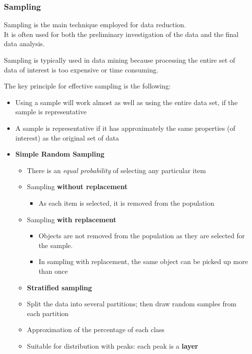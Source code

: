 \subsubsection{Sampling}
Sampling is the main technique employed for data
reduction.\\
It is often used for both the preliminary investigation of the data and the final data analysis.

Sampling is typically used in data mining because
processing the entire set of data of interest is too
expensive or time consuming.

{The key principle for effective sampling is the
following:\ns
\begin{itemize}
	\item Using a sample will work almost as well as using the entire
	      data set, if the sample is representative
	\item A sample is representative if it has approximately the same
	      properties (of interest) as the original set of data
\end{itemize}
}

\begin{itemize}
   \item  \textbf{Simple Random Sampling}
   \begin{itemize}
   	\item There is an \textit{equal probability} of selecting any particular item
	\item Sampling \textbf{without replacement}
   \begin{itemize}
   	\item As each item is selected, it is removed from the population
   \end{itemize}
	\item Sampling \textbf{with replacement}
   \begin{itemize}
   	\item Objects are not removed from the population as they are
   selected for the sample.
	\item In sampling with replacement, the same object can be picked
   up more than once
   \end{itemize}
   \item \textbf{Stratified sampling}
	\item Split the data into several partitions; then draw random samples
   from each partition
	\item Approximation of the percentage of each class
	\item Suitable for distribution with peaks: each peak is a \textbf{layer}
   \end{itemize}
\end{itemize}

